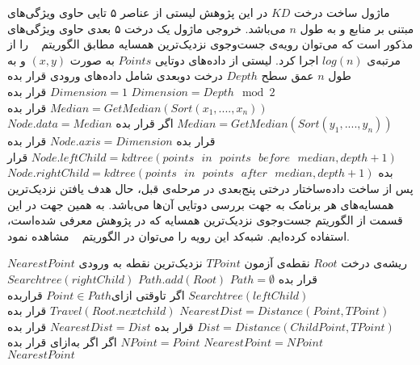 ماژول ساخت درخت $KD$ در این پژوهش لیستی از عناصر ۵ تایی حاوی ویژگی‌های مبتنی بر منابع و به طول $n$ می‌باشد. خروجی ماژول یک درخت ۵ بعدی حاوی ویژگی‌های مذکور است که می‌توان رویه‌ی جست‌و‌جوی نزدیک‌ترین همسایه‌ مطابق الگوریتم ~ را از مرتبه‌ی ${log(n)}$ اجرا کرد. 
 لیستی از داده‌های دوتایی $Points$ به صورت $(x,y)$ و به طول $n$ 
 عمق سطح $Depth$
 درخت دو‌بعدی شامل داده‌های ورودی
 قرار بده 
$Dimension=Depth \mod 2$
 $Dimension=1$
 قرار بده $Median=GetMedian(Sort(x_{1},....,x_{n}))$
 قرار‌ بده
$Median=GetMedian(Sort(y_{1},....,y_{n}))$
‌اگر
 قرار بده $Node.data=Median$
 قرار بده $Node.axis=Dimension$
 قرار بده
$Node.leftChild = kdtree(points \:\:\: in \:\:\: points \:\:\: before \:\:\: median, depth+1)$
 قرار بده
$Node.rightChild = kdtree(points \:\:\: in \:\:\: points \:\:\: after \:\:\: median, depth+1)$
پس از ساخت داده‌ساختار درختی پنج‌بعدی در مرحله‌ی قبل، حال هدف یافتن نزدیک‌ترین همسایه‌های هر برنامک به جهت بررسی دوتایی‌ آن‌ها می‌باشد. به همین جهت در این قسمت از الگوریتم جست‌و‌جوی نزدیک‌ترین همسایه که در پژوهش   معرفی شده‌است، استفاده کرده‌ایم. شبه‌کد این رویه را می‌توان در الگوریتم ~ مشاهده نمود.

 ریشه‌ی درخت $Root$ 
 نقطه‌ی آزمون $TPoint$
 نزدیک‌ترین نقطه به ورودی $NearestPoint$
 قرار‌ بده $Path=\emptyset$
 $Path.add(Root)$
 $Searchtree(rightChild)$
 $Searchtree(leftChild)$
‌اگر
‌تاوقتی
‌ازای{$Point \in Path$}
 قرار‌بده 
$NearestDist=Distance(Point,TPoint)$
 $Travel(Root.nextchild)$
 قرار بده 
$Dist=Distance(ChildPoint,TPoint)$
 قرار بده $NearestDist=Dist$
 قرار بده $NPoint=Point$
‌اگر
‌اگر
‌به‌ازای
 قرار بده $NearestPoint=NPoint$\\
  $NearestPoint$

